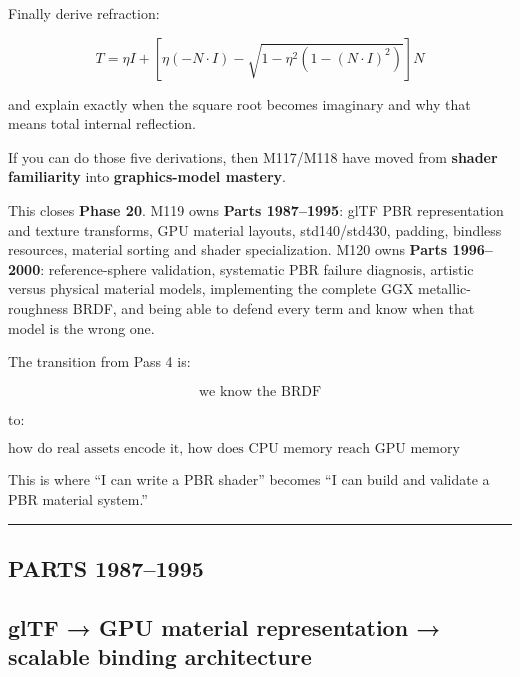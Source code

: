 Finally derive refraction:

\[
T=
\eta I+
\left[
\eta(-N\cdot I)
-
\sqrt{
1-\eta^2
(1-(N\cdot I)^2)
}
\right]N
\]

and explain exactly when the square root becomes imaginary and why that means total internal reflection.

If you can do those five derivations, then M117/M118 have moved from \textbf{shader familiarity} into \textbf{graphics-model mastery}.

This closes \textbf{Phase 20}. M119 owns \textbf{Parts 1987--1995}: glTF PBR representation and texture transforms, GPU material layouts, std140/std430, padding, bindless resources, material sorting and shader specialization. M120 owns \textbf{Parts 1996--2000}: reference-sphere validation, systematic PBR failure diagnosis, artistic versus physical material models, implementing the complete GGX metallic-roughness BRDF, and being able to defend every term and know when that model is the wrong one.

The transition from Pass 4 is:

\[
\boxed{
\text{we know the BRDF}
}
\]

to:

\[
\boxed{
\text{how do real assets encode it, how does CPU memory reach GPU memory correctly, how do thousands of materials scale, and how do we prove the resulting renderer is actually correct?}
}
\]

This is where ``I can write a PBR shader'' becomes ``I can build and validate a PBR material system.''

\begin{center}\rule{0.5\linewidth}{0.5pt}\end{center}

\subsection{PARTS 1987--1995}\label{03-visual-computing-i-ch006-parts-19871995}

\hypertarget{03-visual-computing-i-ch006-parts-19871995}{}

\subsection{glTF → GPU material representation → scalable binding architecture}\label{03-visual-computing-i-ch006-gltf-gpu-material-representation-scalable-binding-architecture}

\hypertarget{03-visual-computing-i-ch006-gltf-gpu-material-representation-scalable-binding-architecture}{}


